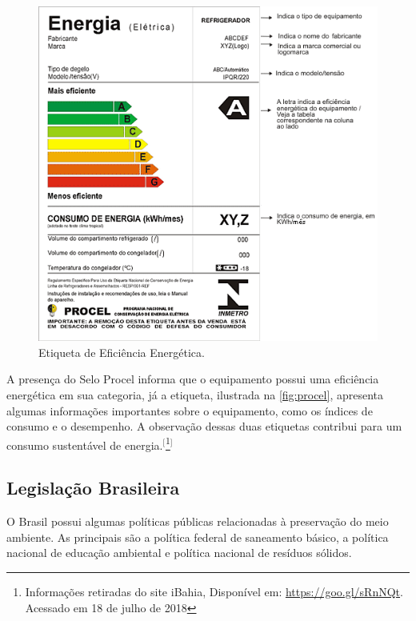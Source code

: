 \begin{figure}[htb]
	\caption{\label{fig:procel}Etiqueta de Eficiência Energética.}
	\begin{center}
	    \includegraphics[scale=0.55]{imagens/procel.png}
	\end{center}
\end{figure}

A presença do Selo Procel informa que o equipamento possui uma eficiência energética em sua categoria, já a etiqueta, ilustrada na \autoref{fig:procel}, apresenta algumas informações importantes sobre o equipamento, como os índices de consumo e o desempenho. A observação dessas duas etiquetas contribui para um consumo sustentável de energia.$^{[}$\footnote{Informações retiradas do site iBahia, Disponível em: \url{https://goo.gl/sRnNQt}. Acessado em 18 de julho de 2018}$^{]}$

\subsection{Legislação Brasileira}

O Brasil possui algumas políticas públicas relacionadas à preservação do meio ambiente. As principais são a política federal de saneamento básico, a política nacional de educação ambiental e política nacional de resíduos sólidos.

